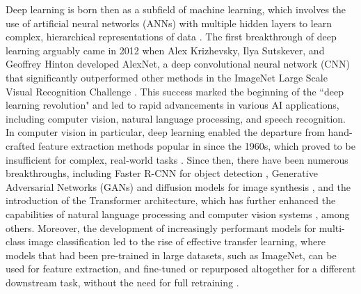 Deep learning is born then as a subfield of machine learning, which involves the use of artificial neural networks (ANNs) with multiple hidden layers to learn complex, hierarchical representations of data \cite{Roberts2021TheTheory}. The first breakthrough of deep learning arguably came in 2012 when Alex Krizhevsky, Ilya Sutskever, and Geoffrey Hinton developed AlexNet, a deep convolutional neural network (CNN) that significantly outperformed other methods in the ImageNet Large Scale Visual Recognition Challenge \cite{Krizhevsky2012ImageNetNetworks}. This success marked the beginning of the ``deep learning revolution" and led to rapid advancements in various AI applications, including computer vision, natural language processing, and speech recognition. In computer vision in particular, deep learning enabled the departure from hand-crafted feature extraction methods popular in since the 1960s, which proved to be insufficient for complex, real-world tasks \cite{Chai2021DeepScenarios}. Since then, there have been numerous breakthroughs, including Faster R-CNN for object detection \cite{Ren2015FasterNetworks}, Generative Adversarial Networks (GANs) and diffusion models for image synthesis \cite{Gui2020AApplications, Rombach2021High-ResolutionModels}, and the introduction of the Transformer architecture, which has further enhanced the capabilities of natural language processing and computer vision systems \cite{Dosovitskiy2020AnScale}, among others. Moreover, the development of increasingly performant models for multi-class image classification led to the rise of effective transfer learning, where models that had been pre-trained in large datasets, such as ImageNet, can be used for feature extraction, and fine-tuned or repurposed altogether for a different downstream task, without the need for full retraining \cite{Iman2022AAdvancements}.

